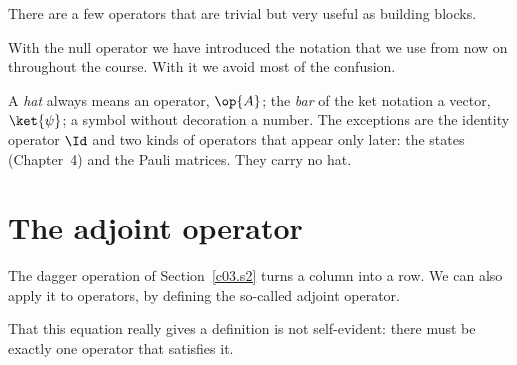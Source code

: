 There are a few operators that are trivial but very useful as building blocks.


With the null operator we have introduced the notation that we use from now on throughout the
course. With it we avoid most of the confusion.

\begin{merksatz}[Notation]
  A \emph{hat} always means an operator, $\op{A}$; the \emph{bar} of the ket notation a vector,
  $\ket{\psi}$; a symbol without decoration a number. The exceptions are the identity operator
  $\Id$ and two kinds of operators that appear only later: the states (Chapter~4) and the Pauli
  matrices. They carry no hat.
\end{merksatz}

\section{The adjoint operator}\label{c03.s9}

The dagger operation of Section~\ref{c03.s2} turns a column into a row. We can also apply it to
operators, by defining the so-called adjoint operator.


That this equation really gives a definition is not self-evident: there must be exactly one
operator that satisfies it.

